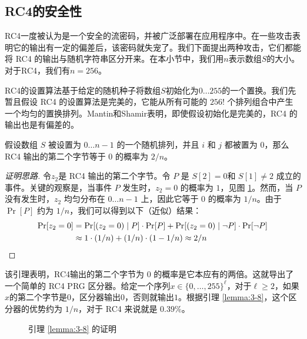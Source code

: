 \subsection{RC4的安全性}


RC4一度被认为是一个安全的流密码，并被广泛部署在应用程序中。在一些攻击表明它的输出有一定的偏差后，该密码就失宠了。我们下面提出两种攻击，它们都能将 RC4 的输出与随机字符串区分开来。在本小节中，我们用$n$表示数组$S$的大小。对于RC4，我们有$n=256$。

\begin{snote}[初始 RC4 输出中的偏差。]
RC4的设置算法基于给定的随机种子将数组$S$初始化为$0 \dots 255$的一个置换。我们先暂且假设 RC4 的设置算法是完美的，它能从所有可能的 $256!$ 个排列组合中产生一个均匀的置换排列。Mantin和Shamir表明，即使假设初始化是完美的，RC4 的输出也是有偏差的。
\end{snote}

\begin{lemma}\label{lemma:3-8}
假设数组 $S$ 被设置为 $0\dots n-1$ 的一个随机排列，并且 $i$ 和 $j$ 都被置为 $0$，那么 RC4 输出的第二个字节等于 $0$ 的概率为 $2/n$。
\end{lemma}

\begin{proof}[证明思路]
令$z_2$是 RC4 输出的第二个字节。令 $P$ 是 $S[2]=0$和 $S[1]\neq2$ 成立的事件。关键的观察是，当事件 $P$ 发生时，$z_2=0$ 的概率为 $1$，见图 \ref{fig:3-13}。然而，当 $P$ 没有发生时，$z_2$ 均匀分布在 $0\dots n-1$ 上，因此它等于 $0$ 的概率为 $1/n$。由于 $\Pr[P]$ 约为 $1/n$，我们可以得到以下（近似）结果：
\[
\begin{aligned}
\Pr[z_2=0] & =\Pr[(z_2=0)\;|\;P]\cdot\Pr[P]+\Pr[(z_2=0)\;|\;\neg P]\cdot\Pr[\neg P]\\
& \approx 1\cdot(1/n)+(1/n)\cdot(1-1/n)\approx2/n\qedhere
\end{aligned}
\]
\end{proof}

该引理表明，RC4输出的第二个字节为 $0$ 的概率是它本应有的两倍。这就导出了一个简单的 RC4 PRG 区分器。给定一个序列$x\in\{0,\dots,255\}^\ell$，对于$\ell\geq2$，如果$x$的第二个字节是$0$，区分器输出$0$，否则就输出$1$。根据引理 \ref{lemma:3-8}，这个区分器的优势约为 $1/n$，对于 RC4 来说就是 $0.39\%$。

\begin{figure}
	\centering
	
	\caption{引理 \ref{lemma:3-8} 的证明}
	\label{fig:3-13}
\end{figure}

